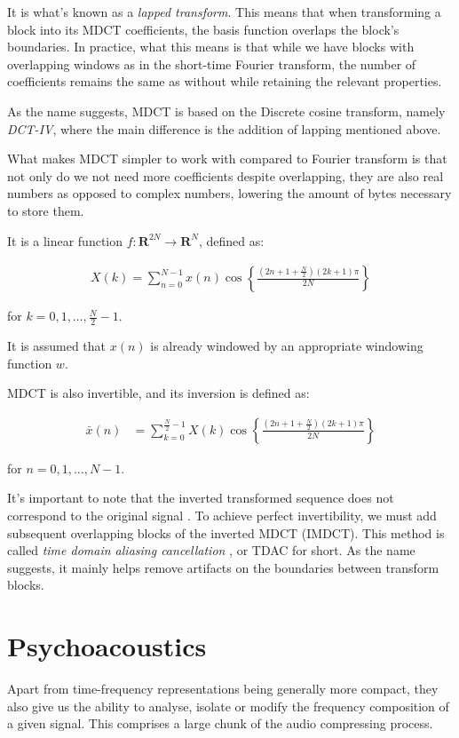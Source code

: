 It is what's known as a \emph{lapped transform}. This means that when transforming a block into its MDCT coefficients, the basis function overlaps the block's boundaries. \cite{Malvar:1992:SPL:531523} In practice, what this means is that while we have blocks with overlapping windows as in the short-time Fourier transform, the number of coefficients remains the same as without while retaining the relevant properties.

As the name suggests, MDCT is based on the Discrete cosine transform, namely \emph{DCT-IV}, where the main difference is the addition of lapping mentioned above.

What makes MDCT simpler to work with compared to Fourier transform is that not only do we not need more coefficients despite overlapping, they are also real numbers as opposed to complex numbers, lowering the amount of bytes necessary to store them.

It is a linear function $f: \mathbf{R}^{2N} \rightarrow \mathbf{R}^N$, defined as: \cite{Babu2013FastAE}

\begin{align}
X(k) = \sum_{n=0}^{N-1} x(n) \cos \left\lbrace \frac{(2n+1+ \frac{N}{2} )(2k+1)\pi }{2N} \right\rbrace
\end{align}

for $k = 0, 1, \ldots, \frac{N}{2}-1$.

It is assumed that $x(n)$ is already windowed by an appropriate windowing function $w$.

MDCT is also invertible, and its inversion is defined as:

\begin{align}
\bar{x}(n) &= \sum_{k=0}^{\frac{N}{2}-1} X(k) \cos \left\lbrace \frac{(2n+1+ \frac{N}{2} )(2k+1)\pi }{2N} \right\rbrace
\end{align}

for $n = 0, 1, \ldots, N-1$.

It's important to note that the inverted transformed sequence does not correspond to the original signal \cite{prince_1986_tdac_1}. To achieve perfect invertibility, we must add subsequent overlapping blocks of the inverted MDCT (IMDCT). This method is called \emph{time domain aliasing cancellation} \cite{prince_1986_tdac_2}, or TDAC for short. As the name suggests, it mainly helps remove artifacts on the boundaries between transform blocks.

\section{Psychoacoustics}
Apart from time-frequency representations being generally more compact, they also give us the ability to analyse, isolate or modify the frequency composition of a given signal. This comprises a large chunk of the audio compressing process.

